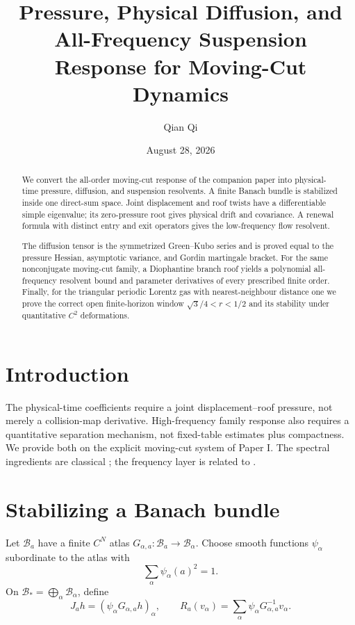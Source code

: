 \documentclass[11pt,reqno]{amsart}
\title[Pressure, diffusion, and all-frequency response]{Pressure, Physical Diffusion, and All-Frequency Suspension Response for Moving-Cut Dynamics}
\author{Qian Qi}
\date{August 28, 2026}
\theoremstyle{definition}
\theoremstyle{remark}
\newcommand{\B}{\mathcal B}
\begin{document}
\begin{abstract}
We convert the all-order moving-cut response of the companion paper into
physical-time pressure, diffusion, and suspension resolvents.  A finite Banach
bundle is stabilized inside one direct-sum space.  Joint displacement and roof
twists have a differentiable simple eigenvalue; its zero-pressure root gives
physical drift and covariance.  A renewal formula with distinct entry and exit
operators gives the low-frequency flow resolvent.

The diffusion tensor is the symmetrized Green--Kubo series and is proved equal
to the pressure Hessian, asymptotic variance, and Gordin martingale bracket.
For the same nonconjugate moving-cut family, a Diophantine branch roof yields a
polynomial all-frequency resolvent bound and parameter derivatives of every
prescribed finite order.  Finally, for the triangular periodic Lorentz gas
with nearest-neighbour distance one we prove the correct open finite-horizon
window $\sqrt3/4<r<1/2$ and its stability under quantitative $C^2$
deformations.
\end{abstract}
\maketitle
\tableofcontents

\section{Introduction}
The physical-time coefficients require a joint displacement--roof pressure,
not merely a collision-map derivative.  High-frequency family response also
requires a quantitative separation mechanism, not fixed-table estimates plus
compactness.  We provide both on the explicit moving-cut system of Paper I.
The spectral ingredients are classical \cite{Kato1995,KellerLiverani1999,
ParryPollicott1990}; the frequency layer is related to
\cite{Dolgopyat1998,ButterleyLiverani2007}.

\section{Stabilizing a Banach bundle}\label{sec:bundle}
Let $\B_a$ have a finite $C^N$ atlas
$G_{\alpha,a}:\B_a\to\B_\alpha$.  Choose smooth functions $\psi_\alpha$
subordinate to the atlas with
\[
 \sum_\alpha\psi_\alpha(a)^2=1.
\]
On $\B_*=\bigoplus_\alpha\B_\alpha$, define
\[
 J_ah=(\psi_\alpha G_{\alpha,a}h)_\alpha,
 \qquad
 R_a(v_\alpha)=\sum_\alpha\psi_\alpha G_{\alpha,a}^{-1}v_\alpha.
\]
\end{document}
